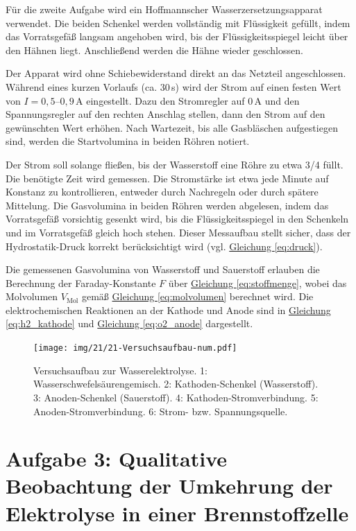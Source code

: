 Für die zweite Aufgabe wird ein Hoffmannscher Wasserzersetzungsapparat verwendet. Die beiden Schenkel werden vollständig mit Flüssigkeit gefüllt, indem das Vorratsgefäß langsam angehoben wird, bis der Flüssigkeitsspiegel leicht über den Hähnen liegt. Anschließend werden die Hähne wieder geschlossen.  

Der Apparat wird ohne Schiebewiderstand direkt an das Netzteil angeschlossen. Während eines kurzen Vorlaufs (ca. 30\,s) wird der Strom auf einen festen Wert von $I = 0,5$–$0,9$\,A eingestellt. Dazu den Stromregler auf 0\,A und den Spannungsregler auf den rechten Anschlag stellen, dann den Strom auf den gewünschten Wert erhöhen. Nach Wartezeit, bis alle Gasbläschen aufgestiegen sind, werden die Startvolumina in beiden Röhren notiert.  

Der Strom soll solange fließen, bis der Wasserstoff eine Röhre zu etwa 3/4 füllt. Die benötigte Zeit wird gemessen. Die Stromstärke ist etwa jede Minute auf Konstanz zu kontrollieren, entweder durch Nachregeln oder durch spätere Mittelung. Die Gasvolumina in beiden Röhren werden abgelesen, indem das Vorratsgefäß vorsichtig gesenkt wird, bis die Flüssigkeitsspiegel in den Schenkeln und im Vorratsgefäß gleich hoch stehen. Dieser Messaufbau stellt sicher, dass der Hydrostatik-Druck korrekt berücksichtigt wird (vgl. \hyperref[eq:druck]{Gleichung \ref*{eq:druck}}).  

Die gemessenen Gasvolumina von Wasserstoff und Sauerstoff erlauben die Berechnung der Faraday-Konstante $F$ über \hyperref[eq:stoffmenge]{Gleichung \ref*{eq:stoffmenge}}, wobei das Molvolumen $V_\mathrm{Mol}$ gemäß \hyperref[eq:molvolumen]{Gleichung \ref*{eq:molvolumen}} berechnet wird. Die elektrochemischen Reaktionen an der Kathode und Anode sind in \hyperref[eq:h2_kathode]{Gleichung \ref*{eq:h2_kathode}} und \hyperref[eq:o2_anode]{Gleichung \ref*{eq:o2_anode}} dargestellt.

\begin{figure}[h!]
    \vspace{1.75cm}
    \texttt{[image: img/21/21-Versuchsaufbau-num.pdf]}
    \caption{Versuchsaufbau zur Wasserelektrolyse. 1: Wasserschwefelsäurengemisch. 2: Kathoden-Schenkel (Wasserstoff). 3: Anoden-Schenkel (Sauerstoff). 4: Kathoden-Stromverbindung. 5: Anoden-Stromverbindung. 6: Strom- bzw. Spannungsquelle.}
    \label{fig:log_gezeichnet}
\end{figure}

\section*{Aufgabe 3: Qualitative Beobachtung der Umkehrung der Elektrolyse in einer Brennstoffzelle}

